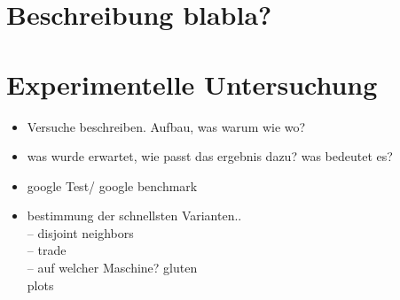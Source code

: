 \documentclass[a4paper]{scrreprt}
\theoremstyle{plain} %
\theoremstyle{definition} %
\begin{document}










\chapter{Beschreibung blabla?}




\chapter{Experimentelle Untersuchung}

\begin{itemize}

\item Versuche beschreiben. Aufbau, was warum wie wo?

\item was wurde erwartet, wie passt das ergebnis dazu? was bedeutet es?


\item
google Test/ google benchmark

\item
bestimmung der schnellsten Varianten..\\
-- disjoint neighbors\\
-- trade\\
-- auf welcher Maschine? gluten\\
plots\\



\end{itemize}




\end{document}
